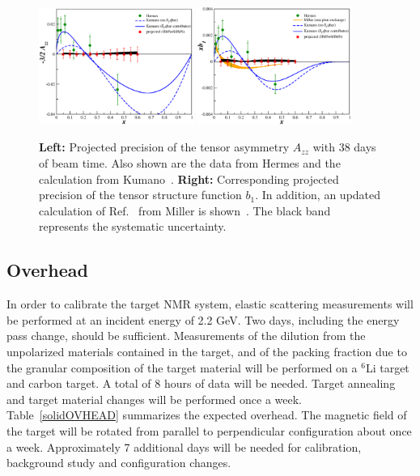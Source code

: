 \begin{figure}
\begin{center}
\includegraphics[width=0.45\textwidth]{figs/solid/Azz_proj_lin_good.eps}
\hspace{0.5cm}
\includegraphics[width=0.45\textwidth]{figs/solid/xb1_proj_newmiller_lin_good.eps}
\caption{\label{solidPROJ}
{\bf Left: }
Projected precision of the tensor asymmetry $A_{zz}$ with 38 days of beam time. Also 
shown are the data from Hermes\cite{Airapetian:2005cb} and the calculation from Kumano~\cite{Kumano:2010vz}.
{\bf Right:} Corresponding projected precision of the tensor structure function $b_1$. In addition,
an updated calculation of Ref.~\cite{Miller:1989nc} from Miller is shown~\cite{Miller_tmp}. The black band
represents the systematic uncertainty.}
\end{center}
\end{figure}
%
\subsection{Overhead}
%
In order to calibrate the target NMR system, elastic scattering measurements will be performed at an 
incident energy of 2.2 GeV. Two days, including the energy pass change, should be sufficient. Measurements
of the dilution from the unpolarized materials contained in the target, and of the packing fraction due to 
the granular composition of the target material will be performed on a $^6$Li target and carbon target. 
A total of 8 hours of data will be needed. Target annealing and target material changes will be performed once 
a week. Table~\ref{solidOVHEAD} summarizes the expected overhead. The magnetic field of the target will be 
rotated from parallel to perpendicular configuration about once a week.
Approximately 7 additional days will be needed for calibration, background study and configuration changes.

